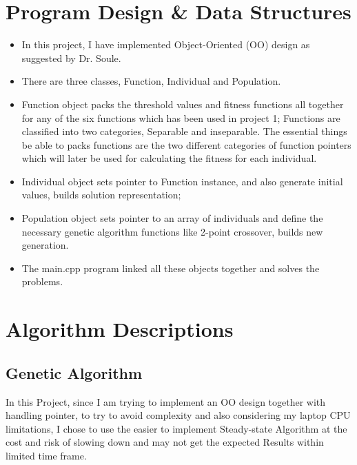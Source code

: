 \documentclass[10pt,b5paper]{article}
\begin{document}
\section{Program Design \& Data Structures}
\label{sec-1}
\begin{itemize}
\item In this project, I have implemented Object-Oriented (OO) design as suggested by Dr. Soule.
\item There are three classes, Function, Individual and Population.
\item Function object packs the threshold values and fitness functions all together for any of the six functions which has been used in project 1; Functions are classified into two categories, Separable and inseparable. The essential things be able to packs functions are the two different categories of function pointers which will later be used for calculating the fitness for each individual.
\item Individual object sets pointer to Function instance, and also generate initial values, builds solution representation;
\item Population object sets pointer to an array of individuals and define the necessary genetic algorithm functions like 2-point crossover, builds new generation.
\item The main.cpp program linked all these objects together and solves the problems.
\end{itemize}
\section{Algorithm Descriptions}
\label{sec-2}
\subsection{Genetic Algorithm}
\label{sec-2-1}
In this Project, since I am trying to implement an OO design together with handling pointer, to try to avoid complexity and also considering my laptop CPU limitations, I chose to use the easier to implement Steady-state Algorithm at the cost and risk of slowing down and may not get the expected Results within limited time frame.
\end{document}
